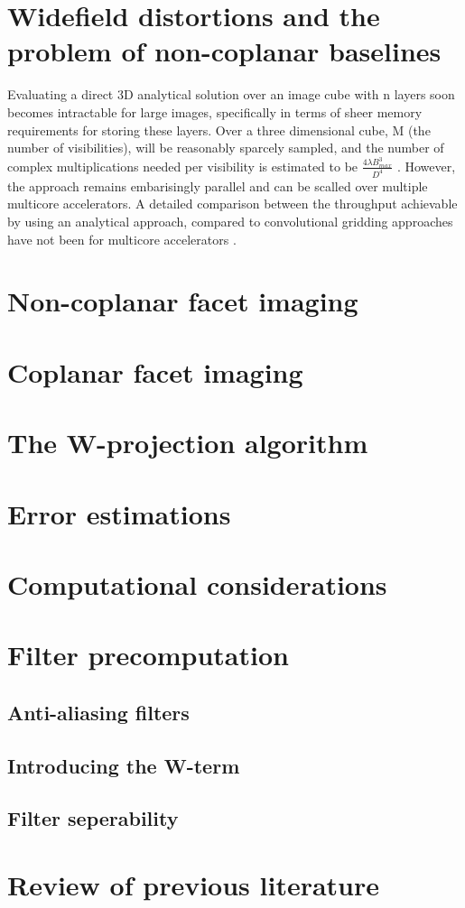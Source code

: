 \section{Widefield distortions and the problem of non-coplanar baselines}
Evaluating a direct 3D analytical solution over an image cube with n layers soon becomes intractable for large images, specifically in terms of sheer memory requirements for storing these layers. Over a three dimensional cube, M (the number of visibilities),
will be reasonably sparcely sampled, and the number of complex multiplications needed per visibility is estimated to be $\frac{4\lambda B_{max}^3}{D^4}$ \cite{yashar2009tdp}. However, the approach remains embarisingly parallel and can
be scalled over multiple multicore accelerators. A detailed comparison between the throughput achievable by using an analytical approach, compared to convolutional gridding approaches have not been for multicore accelerators \cite{hardy2013direct}.
\section{Non-coplanar facet imaging}
\section{Coplanar facet imaging}
\section{The W-projection algorithm}
\section{Error estimations}
\section{Computational considerations}
\section{Filter precomputation}
\subsection{Anti-aliasing filters}
\subsection{Introducing the W-term}
\subsection{Filter seperability}
\section{Review of previous literature}